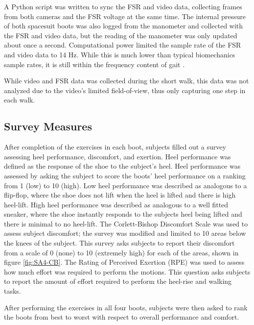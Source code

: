 \documentclass[defaultstyle,11pt]{thesis}
\begin{document}
A Python script was written to sync the FSR and video data, collecting frames from both cameras and the FSR voltage at the same time.
The internal pressure of both spacesuit boots was also logged from the manometer and collected with the FSR and video data, but the reading of the manometer was only updated about once a second.
Computational power limited the sample rate of the FSR and video data to 14 Hz.
While this is much lower than typical biomechanics sample rates, it is still within the frequency content of gait \citep{Antonsson1985}.

While video and FSR data was collected during the short walk, this data was not analyzed due to the video's limited field-of-view, thus only capturing one step in each walk.

\hypertarget{survey-measures}{%
\subsection{Survey Measures}\label{survey-measures}}

After completion of the exercises in each boot, subjects filled out a survey assessing heel performance, discomfort, and exertion.
Heel performance was defined as the response of the shoe to the subject's heel.
Heel performance was assessed by asking the subject to score the boots' heel performance on a ranking from 1 (low) to 10 (high).
Low heel performance was described as analogous to a flip-flop, where the shoe does not lift when the heel is lifted and there is high heel-lift.
High heel performance was described as analogous to a well fitted sneaker, where the shoe instantly responds to the subjects heel being lifted and there is minimal to no heel-lift.
The Corlett-Bishop Discomfort Scale \citep{Corlett1976} was used to assess subject discomfort; the survey was modified and limited to 10 areas below the knees of the subject.
This survey asks subjects to report their discomfort from a scale of 0 (none) to 10 (extremely high) for each of the areas, shown in figure \ref{fig:SA4-CB}.
The Rating of Perceived Exertion (RPE) \citep{Borg1982} was used to assess how much effort was required to perform the motions.
This question asks subjects to report the amount of effort required to perform the heel-rise and walking tasks.

After performing the exercises in all four boots, subjects were then asked to rank the boots from best to worst with respect to overall performance and comfort.
\end{document}
